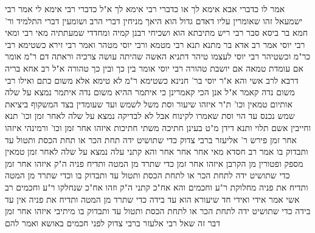 \documentclass[12pt, openany]{book}
\begin{document}
{אמר לו כדברי אבא אימא לך או כדברי רבי אימא לך א"ל כדברי רבי אימא לי 
אמר רבי ישמעאל זהו שאומרין עליו דאדם גדול הוא היאך מניחין דברי הרב ושומעין דברי התלמיד 
ור' חמא בר ביסא סבר רבי ריש מתיבתא הוא ושכיחי רבנן קמיה ומחדדי שמעתתיה 
מאי רבי ומאי רבי יוסי אמר רב אדא בר מתנא תנא רבי מטמא ורבי יוסי מטהר 
ואמר רבי זירא כשטימא רבי כר"מ וכשטיהר רבי יוסי לעצמו טיהר 
דתניא האשה שהיתה עושה צרכיה וראתה דם ר"מ אומר אם עומדת טמאה אם יושבת טהורה 
רבי יוסי אומר בין כך ובין כך טהורה 
א"ל רב אחא בריה דרבא לרב אשי והא א"ר יוסי בר' חנינא כשטימא ר"מ לא טימא אלא משום כתם ואילו רבי משום נדה קאמר א"ל אנן הכי קאמרינן כי איתמר ההיא משום נדה איתמר
נמצא על שלה אותיום טמאין וכו' ת"ר איזהו שיעור וסת משל לשמש ועד שעומדין בצד המשקוף ביציאת שמש נכנס עד
הוי וסת שאמרו לקינוח אבל לא לבדיקה
נמצא על שלה לאחר זמן וכו' תנא וחייבין אשם תלוי ותנא דידן מ"ט 
בעינן חתיכה משתי חתיכות
איזהו אחר זמן וכו' ורמינהי איזהו אחר זמן פירש ר' אליעזר ברבי צדוק כדי שתושיט ידה תחת הכר או תחת הכסת ותטול עד ותבדוק בו 
אמר רב חסדא מאי אחר אחר אחר 
והא קתני עלה נמצא על שלה לאחר זמן טמאין מספק ופטורין מן הקרבן איזהו אחר זמן כדי שתרד מן המטה ותדיח פניה 
ה"ק איזהו אחר זמן כדי שתושיט ידה לתחת הכר או לתחת הכסת ותטול עד ותבדוק בו וכדי שתרד מן המטה ותדיח את פניה מחלוקת ר"ע וחכמים 
והא אח"כ קתני ה"ק וזהו אח"כ שנחלקו ר"ע וחכמים 
רב אשי אמר אידי ואידי חד שיעורא הוא עד בידה כדי שתרד מן המטה ותדיח את פניה אין עד בידה כדי שתושיט ידה לתחת הכר או לתחת הכסת ותטול עד ותבדוק בו 
מיתיבי איזהו אחר זמן דבר זה שאל רבי אלעזר ברבי צדוק לפני חכמים באושא ואמר להם}
\end{document}
